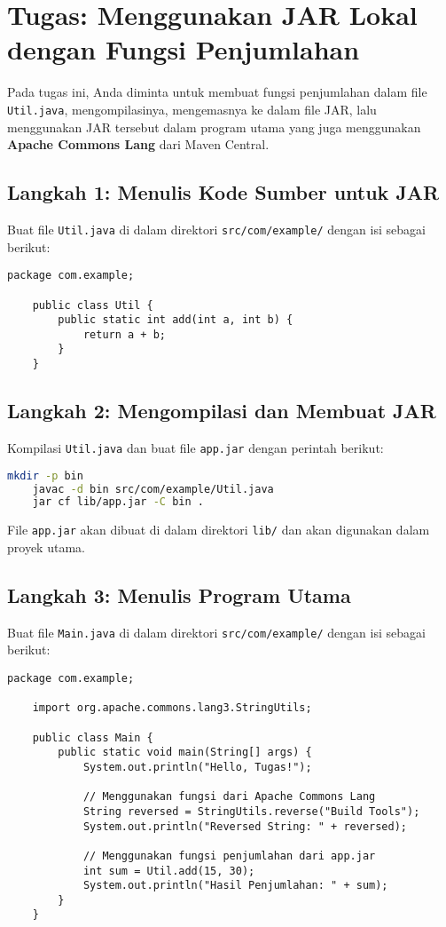 \section{Tugas: Menggunakan JAR Lokal dengan Fungsi Penjumlahan}
Pada tugas ini, Anda diminta untuk membuat fungsi penjumlahan dalam file \texttt{Util.java}, mengompilasinya, mengemasnya ke dalam file JAR, lalu menggunakan JAR tersebut dalam program utama yang juga menggunakan \textbf{Apache Commons Lang} dari Maven Central.

\subsection{Langkah 1: Menulis Kode Sumber untuk JAR}
Buat file \texttt{Util.java} di dalam direktori \texttt{src/com/example/} dengan isi sebagai berikut:

\begin{lstlisting}[style=JavaStyle]
	package com.example;
	
	public class Util {
		public static int add(int a, int b) {
			return a + b;
		}
	}
\end{lstlisting}

\subsection{Langkah 2: Mengompilasi dan Membuat JAR}
Kompilasi \texttt{Util.java} dan buat file \texttt{app.jar} dengan perintah berikut:

\begin{lstlisting}[language=bash]
	mkdir -p bin
	javac -d bin src/com/example/Util.java
	jar cf lib/app.jar -C bin .
\end{lstlisting}

File \texttt{app.jar} akan dibuat di dalam direktori \texttt{lib/} dan akan digunakan dalam proyek utama.

\subsection{Langkah 3: Menulis Program Utama}
Buat file \texttt{Main.java} di dalam direktori \texttt{src/com/example/} dengan isi sebagai berikut:

\begin{lstlisting}[style=JavaStyle]
	package com.example;
	
	import org.apache.commons.lang3.StringUtils;
	
	public class Main {
		public static void main(String[] args) {
			System.out.println("Hello, Tugas!");
			
			// Menggunakan fungsi dari Apache Commons Lang
			String reversed = StringUtils.reverse("Build Tools");
			System.out.println("Reversed String: " + reversed);
			
			// Menggunakan fungsi penjumlahan dari app.jar
			int sum = Util.add(15, 30);
			System.out.println("Hasil Penjumlahan: " + sum);
		}
	}
\end{lstlisting}

